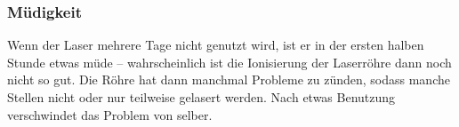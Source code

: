 \documentclass{\basedir/fablab-document}
\begin{document}
	\subsubsection{Müdigkeit}
	Wenn der Laser mehrere Tage nicht genutzt wird, ist er in der ersten halben Stunde etwas müde -- wahrscheinlich ist die Ionisierung der Laserröhre dann noch nicht so gut. Die Röhre hat dann manchmal Probleme zu zünden, sodass manche Stellen nicht oder nur teilweise gelasert werden. Nach etwas Benutzung verschwindet das Problem von selber.


	\newpage
\end{document}
